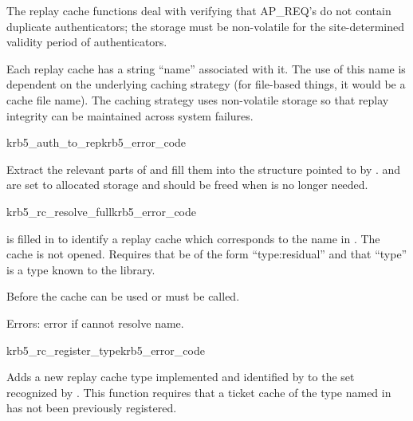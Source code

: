 The replay cache functions deal with verifying that AP_REQ's do not
contain duplicate authenticators; the storage must be non-volatile for
the site-determined validity period of authenticators.

Each replay cache has a string ``name'' associated with it.  The use of
this name is dependent on the underlying caching strategy (for
file-based things, it would be a cache file name).  The
caching strategy uses non-volatile storage so that replay
integrity can be maintained across system failures.

\begin{funcdecl}{krb5_auth_to_rep}{krb5_error_code}{\funcinout}
\funcin
{}
\funcout
{}
\end{funcdecl}
Extract the relevant parts of  and fill them into the
structure pointed to by .  
and  are set to allocated storage and
should be freed when  is no longer needed.

\begin{funcdecl}{krb5_rc_resolve_full}{krb5_error_code}{\funcinout}
\funcin
{}
\end{funcdecl}

\begin{sloppypar}
 is filled in to identify a replay cache which
corresponds to the name in .  The cache is not opened.
Requires that  be of the form ``type:residual''
and that ``type'' is a type known to the library.
\end{sloppypar}

Before the cache can be used  or
 must be called.

Errors: error if cannot resolve name.

\begin{funcdecl}{krb5_rc_register_type}{krb5_error_code}{\funcin}
\end{funcdecl}
Adds a new replay cache type implemented and identified by
 to the set recognized by
.  This function requires that a ticket
cache of the type named in 
 has not been previously registered.


